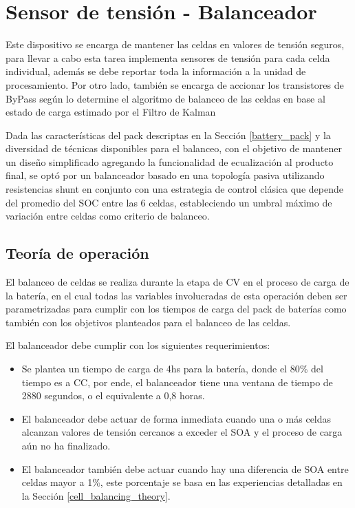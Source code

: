 \documentclass[10pt, a4paper]{report}
\begin{document}
\section{Sensor de tensi\'on - Balanceador}

Este dispositivo se encarga de mantener las celdas en valores de tensión seguros, para llevar a cabo esta tarea implementa sensores de tensión para cada celda individual, además se debe reportar toda la información a la unidad de procesamiento.
Por otro lado, también se encarga de accionar los transistores de ByPass según lo determine el algoritmo de balanceo de las celdas en base al estado de carga estimado por el Filtro de Kalman

Dada las caracter\'isticas del pack descriptas en la Secci\'on \ref{battery_pack} 
y la diversidad de t\'ecnicas disponibles para el balanceo, con el objetivo de
mantener un diseño simplificado agregando la funcionalidad de ecualizaci\'on al
producto final, se opt\'o por un balanceador basado en una topolog\'ia pasiva 
utilizando resistencias shunt en conjunto con una estrategia de control
cl\'asica que depende del promedio del \acrshort{SOC} entre las 6 celdas,
estableciendo un umbral m\'aximo de variaci\'on entre celdas como criterio de
balanceo. 


\subsection{Teor\'ia de operaci\'on}\label{seq:bal_theory}

El balanceo de celdas se realiza durante la etapa de \acrshort{CV} en el proceso
de carga de la bater\'ia, en el cual todas las variables involucradas de esta
operaci\'on deben ser parametrizadas para cumplir con los tiempos de carga del
pack de bater\'ias como tambi\'en con los objetivos planteados para el balanceo de
las celdas.

El balanceador debe cumplir con los siguientes requerimientos:

\begin{itemize}
    \item Se plantea un tiempo de carga de 4hs para la bater\'ia, donde el 80\%
        del tiempo es a \acrshort{CC}, por ende, el balanceador tiene una
       ventana de tiempo de 2880 segundos, o el equivalente a 0,8 horas.
    \item El balanceador debe actuar de forma inmediata cuando una o m\'as
        celdas alcanzan valores de tensi\'on cercanos a exceder el 
        \acrshort{SOA} y el proceso de carga a\'un no ha finalizado.
    \item El balanceador tambi\'en debe actuar cuando hay una diferencia de
        \acrshort{SOA} entre celdas mayor a 1\%, este porcentaje se basa en las
        experiencias detalladas en la Secci\'on \ref{cell_balancing_theory}.
\end{itemize}
\end{document}
